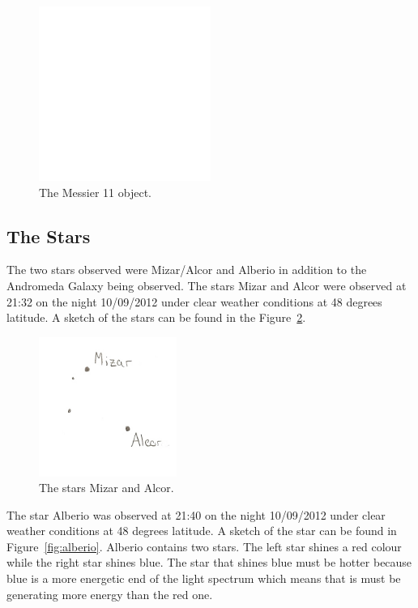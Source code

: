 \documentclass{article}
\begin{document}
\begin{figure}[h]
\centering
\includegraphics[width=0.5\textwidth]{images/blank}
\caption{The Messier 11 object.\label{fig:m11}}
\end{figure}

\subsection{The Stars}

The two stars observed were Mizar/Alcor and Alberio in addition to the Andromeda Galaxy being observed. The stars Mizar and Alcor
were observed at 21:32 on the night 10/09/2012 under clear weather conditions at 48 degrees latitude. A sketch of the stars can be 
found in the Figure~\ref{fig:mizar}.

\begin{figure}[h!]
\centering
\includegraphics[width=0.4\textwidth]{images/Mizar}
\caption{The stars Mizar and Alcor.\label{fig:mizar}}
\end{figure}

The star Alberio was observed at 21:40 on the night 10/09/2012 under clear weather conditions at 48 degrees latitude. A sketch of the 
star can be found in Figure~\ref{fig:alberio}. Alberio contains two stars. The left star shines a red colour while the right star shines blue.
The star that shines blue must be hotter because blue is a more energetic end of the light spectrum which means that is must be
generating more energy than the red one.
\end{document}
